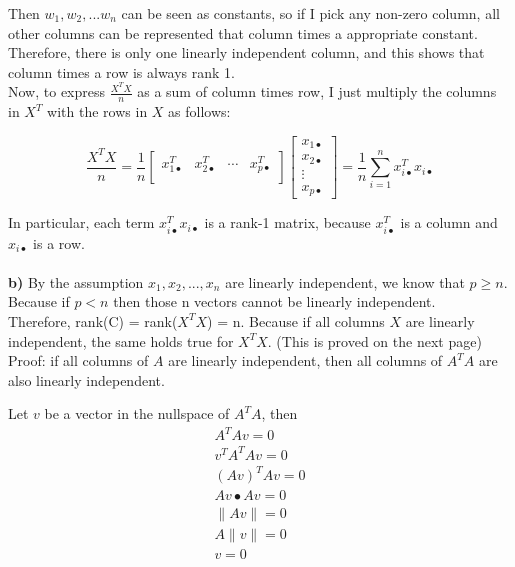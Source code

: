 \documentclass[paper=a4, fontsize=11pt]{scrartcl} %
\numberwithin{equation}{section} %
\numberwithin{figure}{section} %
\numberwithin{table}{section} %
\begin{document}
Then $w_1,w_2,...w_n$ can be seen as constants, so if I pick any non-zero column, all other columns can be represented that column times a appropriate constant. Therefore, there is only one linearly independent column, and this shows that column times a row is always rank 1.  \\

Now, to express $\frac{X^TX}{n}$ as a sum of column times row, I just multiply the columns in $X^T$ with the rows in $X$ as follows: 

$$
\frac{X^TX}{n} = 
\frac{1}{n}
\begin{bmatrix}
x^T_{1 \bullet} & x^T_{2 \bullet} & \cdots & x^T_{p \bullet} \\
\end{bmatrix}
%
\begin{bmatrix}
x_{1 \bullet} \\
x_{2 \bullet} \\
\vdots \\
x_{p \bullet} 
\end{bmatrix}
=
\frac{1}{n}
\displaystyle\sum_{i=1}^{n} x^T_{i \bullet} x_{i \bullet} 
$$

In particular, each term $ x^T_{i \bullet} x_{i \bullet} $ is a rank-1 matrix, because $x^T_{i \bullet}$ is a column and $x_{i \bullet} $ is a row.  \\\\

\textbf{b)} By the assumption $x_1, x_2, ..., x_n $ are linearly independent, we know that $p \geq n$. Because if  $p < n$ then those n vectors cannot be linearly independent. \\

Therefore, rank(C) = rank($X^T X$) = n. Because if all columns $X$ are linearly independent, the same holds true for $X^T X$. (This is proved on the next page)\\ 


\newpage
Proof: if all columns of $A$ are linearly independent, then all columns of $A^T A$ are also linearly independent. 

Let $v$ be a vector in the nullspace of $A^T A$, then 
\begin{equation*} \label{eq1}
\begin{split}
A^T A v = 0 \\
v^T A^T A v = 0 \\ 
(Av)^T A v = 0 \\ 
Av \bullet A v = 0 \\ 
\|A v\| = 0 \\
A \|v\| = 0 \\ 
v = 0
\end{split}
\end{equation*}
\end{document}
